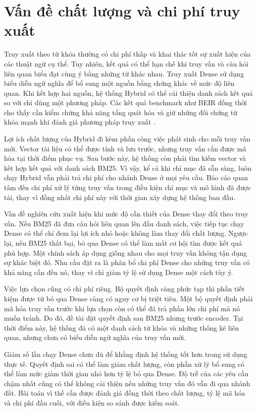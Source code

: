 \section{Vấn đề chất lượng và chi phí truy xuất}
Truy xuất theo từ khóa thường có chi phí thấp và khai thác tốt sự xuất hiện của các thuật ngữ cụ thể. Tuy nhiên, kết quả có thể hạn chế khi truy vấn và câu hỏi liên quan biểu đạt cùng ý bằng những từ khác nhau. Truy xuất Dense sử dụng biểu diễn ngữ nghĩa để bổ sung một nguồn bằng chứng khác về mức độ liên quan. Khi kết hợp hai nguồn, hệ thống Hybrid có thể cải thiện danh sách kết quả so với chỉ dùng một phương pháp. Các kết quả benchmark như BEIR đồng thời cho thấy cần kiểm chứng khả năng tổng quát hóa và giữ những đối chứng từ khóa mạnh khi đánh giá phương pháp truy xuất \cite{beir2021}.

Lợi ích chất lượng của Hybrid đi kèm phần công việc phát sinh cho mỗi truy vấn mới. Vector tài liệu có thể được tính và lưu trước, nhưng truy vấn cần được mã hóa tại thời điểm phục vụ. Sau bước này, hệ thống còn phải tìm kiếm vector và kết hợp kết quả với danh sách BM25. Vì vậy, kể cả khi chỉ mục đã sẵn sàng, luôn chạy Hybrid vẫn phải trả chi phí cho nhánh Dense ở mọi yêu cầu. Báo cáo quan tâm đến chi phí xử lý từng truy vấn trong điều kiện chỉ mục và mô hình đã được tải, thay vì đồng nhất chi phí này với thời gian xây dựng hệ thống ban đầu.

Vấn đề nghiên cứu xuất hiện khi mức độ cần thiết của Dense thay đổi theo truy vấn. Nếu BM25 đã đưa câu hỏi liên quan lên đầu danh sách, việc tiếp tục chạy Dense có thể chỉ đem lại lợi ích nhỏ hoặc không làm thay đổi chất lượng. Ngược lại, nếu BM25 thất bại, bỏ qua Dense có thể làm mất cơ hội tìm được kết quả phù hợp. Một chính sách áp dụng giống nhau cho mọi truy vấn không tận dụng sự khác biệt đó. Nhu cầu đặt ra là phân bổ chi phí Dense cho những truy vấn có khả năng cần đến nó, thay vì chỉ giảm tỷ lệ sử dụng Dense một cách tùy ý.

Việc lựa chọn cũng có chi phí riêng. Bộ quyết định càng phức tạp thì phần tiết kiệm được từ bỏ qua Dense càng có nguy cơ bị triệt tiêu. Một bộ quyết định phải mã hóa truy vấn trước khi lựa chọn còn có thể đã trả phần lớn chi phí mà nó muốn tránh. Do đó, đề tài đặt quyết định sau BM25 nhưng trước encoder. Tại thời điểm này, hệ thống đã có một danh sách từ khóa và những thống kê liên quan, nhưng chưa có biểu diễn ngữ nghĩa của truy vấn mới.

Giảm số lần chạy Dense chưa đủ để khẳng định hệ thống tốt hơn trong sử dụng thực tế. Quyết định sai có thể làm giảm chất lượng, còn phần xử lý bổ sung có thể làm mức giảm thời gian nhỏ hơn tỷ lệ bỏ qua Dense. Độ trễ của các yêu cầu chậm nhất cũng có thể không cải thiện nếu những truy vấn đó vẫn đi qua nhánh đắt. Bài toán vì thế cần được đánh giá đồng thời theo chất lượng, tỷ lệ mã hóa và chi phí đầu cuối, với điều kiện so sánh được kiểm soát.

